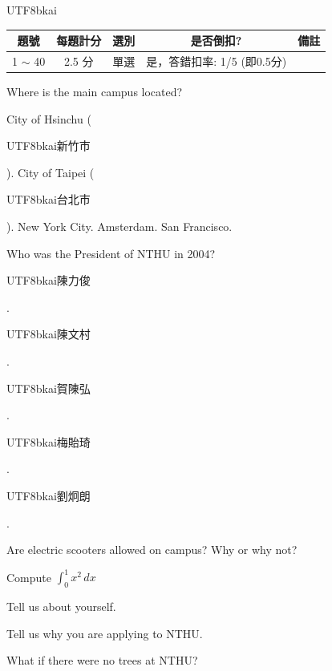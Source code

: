 \documentclass[a4paper,addpoints,12pt]{exam}
\newcommand{\ctext}[1]{\begin{CJK}{UTF8}{bkai}#1\end{CJK}}
\begin{document}
\begin{center}
\ctext{
\begin{tabular}{|c|c|c|c|c|}\hline
 題號    &  每題計分 & 選別 & 是否倒扣? & 備註\\\hline
  1 $\sim$ 40   &  2.5 分 & 單選 & 是，答錯扣率: 1/5 (即0.5分) & \\\hline
\end{tabular}}
\end{center}



\begin{questions}
\question[5]	Where is the main campus located? 

\begin{choices}
\CorrectChoice	City of Hsinchu (\ctext{新竹市}).
\choice	City of Taipei (\ctext{台北市}). 
\choice	New York City. 
\choice	Amsterdam. 
\choice	San Francisco.
\end{choices}

\question[5] Who was the President of NTHU in 2004? 

\begin{oneparchoices}
\choice	\ctext{陳力俊}.
\choice	\ctext{陳文村}. 
\choice	\ctext{賀陳弘}. 
\choice	\ctext{梅貽琦}. 
\CorrectChoice	\ctext{劉炯朗}. 
\end{oneparchoices}

\question[10] Are electric scooters allowed on campus? Why or why not?

\vspace{2in}

\question[10] Compute $\displaystyle\int_0^1 x^2\,dx$

\makeemptybox{2in}

\question[10] Tell us about yourself.

\fillwithlines{1in}

\question[10] Tell us why you are applying to NTHU.

\fillwithdottedlines{1in}

\question[20] What if there were no trees at NTHU?
\end{questions}
\end{document}
